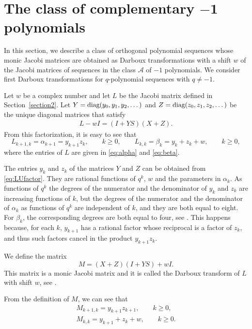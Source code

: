 \documentclass[pdftex]{sigma}
\def\cA{\mathcal A}
\def\diag{\hbox{diag}}
\numberwithin{equation}{section}
\begin{document}
\section[The class of complementary -1 polynomials]{The class of complementary $\boldsymbol{-1}$ polynomials}\label{section6}

In this section, we describe a class of orthogonal polynomial sequences whose monic Jacobi matrices are obtained as Darboux transformations with a shift $w$ of the Jacobi matrices of sequences in the class $\cA$ of $-1$ polynomials. We consider first Darboux transformations for $q$-polynomial sequences with $q \ne -1$.

Let $w$ be a complex number and let $L$ be the Jacobi matrix defined in Section~\ref{section2}. Let ${Y=\diag(y_0,y_1,y_2,\dots)}$ and $Z=\diag(z_0,z_1,z_2,\dots)$ be the unique diagonal matrices that satisfy
\begin{gather} \label{eq:LUfactor}
L -w I = (I + Y S) ( X+Z).
\end{gather}
From this factorization, it is easy to see that
\begin{equation*}%
	L_{k+1,k}=\alpha_{k+1}= y_{k+1} z_k, \qquad k\ge 0,
\qquad %
	L_{k,k}=\beta_k= y_k+ z_k +w, \qquad k\ge 0,
\end{equation*}
where the entries of $L$ are given in \eqref{eq:alpha} and \eqref{eq:beta}.

The entries $y_k$ and $z_k$ of the matrices $Y$ and $Z$
 can be obtained from \eqref{eq:LUfactor}. They are rational functions of $q^k$, $w$ and the parameters in $\alpha_k$. As functions of $q^k$ the degrees of the numerator and the denominator of $y_k$ and $z_k$ are increasing functions of $k$, but the degrees of the numerator and the denominator of $\alpha_k$ as functions of $q^k$ are independent of $k$, and they are both equal to eight. For $\beta_k$, the corresponding degrees are both equal to four, see \cite[Section~7]{Uni}. This happens because, for each $k$, $y_{k+1}$ has a rational factor whose reciprocal is a factor of $z_k$, and thus such factors cancel in the product $y_{k+1} z_k$.

 We define the matrix
 \begin{equation}\label{eq:Darb}
	 M= (X+Z) (I+ Y S)+ w I.
	\end{equation}
This matrix is a monic Jacobi matrix and it is called the Darboux transform of $L$ with shift $w$, see \cite{BuenoM}.

From the definition of $M$, we can see that
\begin{gather}\label{eq:alMyz}
	M_{k+1,k}= y_{k+1} z_{k+1}, \qquad k \ge 0,\\
\label{eq:beMyz}
	M_{k,k}= y_{k+1} + z_k + w, \qquad k\ge 0.
\end{gather}
\end{document}
